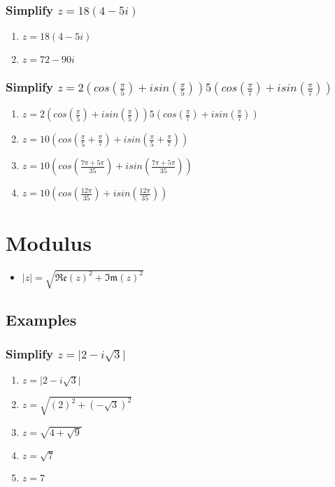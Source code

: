 \documentclass{report}
\newcommand{\re}[1]{\mathfrak{Re}(#1)}
\newcommand{\im}[1]{\mathfrak{Im}(#1)}
\newcommand{\abs}[1]{\mathopen|#1\mathclose|}
\renewcommand{\sin}[1]{sin(#1)}
\renewcommand{\cos}[1]{cos(#1)}
\begin{document}
                \subsubsection{Simplify $z=18(4-5i)$}
                    \begin{enumerate}
                        \item $z=18(4-5i)$
                        \item $z=72-90i$
                    \end{enumerate}
                \subsubsection{Simplify $z=2(\cos{\frac{\pi}{5}}+i\sin{\frac{\pi}{5}})5(\cos{\frac{\pi}{7}}+i\sin{\frac{\pi}{7}})$}
                    \begin{enumerate}
                        \item $z=2(\cos{\frac{\pi}{5}}+i\sin{\frac{\pi}{5}})5(\cos{\frac{\pi}{7}}+i\sin{\frac{\pi}{7}})$
                        \item $z=10(\cos{\frac{\pi}{5}+\frac{\pi}{7}}+i\sin{\frac{\pi}{5}+\frac{\pi}{7}})$
                        \item $z=10(\cos{\frac{7\pi+5\pi}{35}}+i\sin{\frac{7\pi+5\pi}{35}})$
                        \item $z=10(\cos{\frac{12\pi}{35}}+i\sin{\frac{12\pi}{35}})$
                    \end{enumerate}
        \section{Modulus}
            \begin{itemize}
                \item $\abs{z}=\sqrt{\re{z}^{2}+\im{z}^{2}}$
            \end{itemize}
            \subsection{Examples}
                \subsubsection{Simplify $z=\abs{2-i\sqrt{3}}$}
                    \begin{enumerate}
                        \item $z=\abs{2-i\sqrt{3}}$
                        \item $z=\sqrt{(2)^2+(-\sqrt{3})^2}$
                        \item $z=\sqrt{4+\sqrt{9}}$
                        \item $z=\sqrt{7}$
                        \item $z=7$
                    \end{enumerate}
\end{document}
